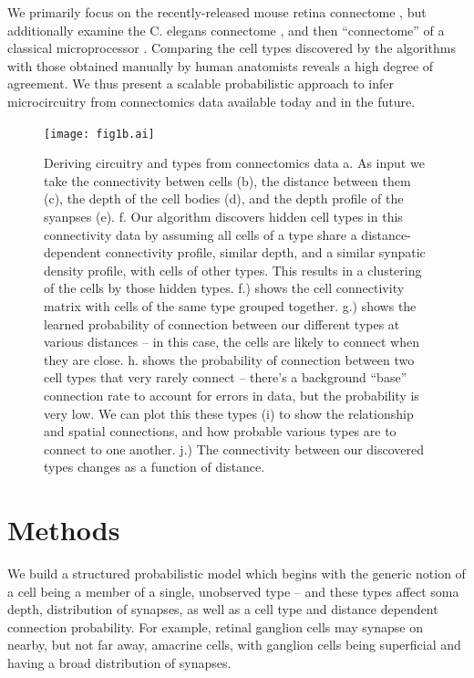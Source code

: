 \documentclass{article}
\begin{document}
We primarily focus on the recently-released mouse retina connectome
\autocite{Helmstaedter2013}, but additionally examine the C. elegans
connectome \autocite{White1986}, and then ``connectome'' of a
classical microprocessor \autocite{James2010}. Comparing the cell
types discovered by the algorithms with those obtained manually by
human anatomists reveals a high degree of agreement. We thus present a
scalable probabilistic approach to infer microcircuitry from
connectomics data available today and in the future. 

\begin{figure}
  \centering 
  \centerline{\texttt{[image: fig1b.ai]}}
  \caption{Deriving circuitry and types from connectomics data a. As input we take the connectivity betwen cells (b), the distance between them (c), the depth of the cell bodies (d), and the depth profile of the syanpses (e). f. Our algorithm discovers hidden cell types in this
    connectivity data by assuming all cells of a type share a
    distance-dependent connectivity profile, similar depth, and a
    similar synpatic density profile, with cells of other types.  This
    results in a clustering of the cells by those hidden
    types. f.) shows the cell connectivity matrix with cells of the
    same type grouped together. g.) shows the learned probability of
    connection between our different types at various distances -- in
    this case, the cells are likely to connect when they are
    close. h. shows the probability of connection between two cell types
that very rarely connect -- there's a background ``base'' connection rate
to account for errors in data, but the probability is very low. 
We can plot this these types (i) to show the relationship and spatial
connections, and how probable various types are to connect to one
another. j.) The connectivity between our discovered types changes as a
function of distance. }

\label{fig:overview}
\end{figure}

\section*{Methods}


We build a structured probabilistic model which begins with the
generic notion of a cell being a member of a single, unobserved type
-- and these types affect soma depth, distribution of synapses, as
well as a cell type and distance dependent connection probability. For
example, retinal ganglion cells may synapse on nearby, but not far
away, amacrine cells, with ganglion cells being superficial and having
a broad distribution of synapses.  
\end{document}
